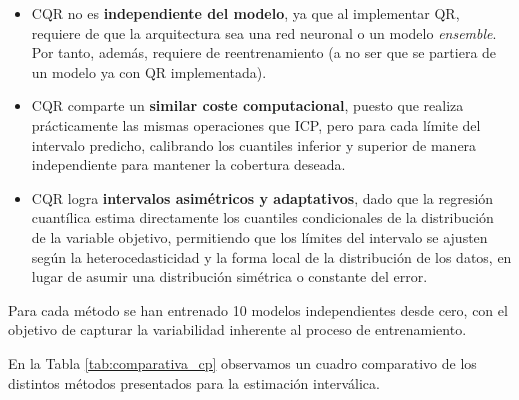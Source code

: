 \begin{itemize}
    \item \acrshort{CQR} no es \textbf{independiente del modelo}, ya que al implementar \acrshort{QR}, requiere de que la arquitectura sea una red neuronal o un modelo \textit{ensemble}. Por tanto, además, requiere de reentrenamiento (a no ser que se partiera de un modelo ya con \acrshort{QR} implementada).
    \item \acrshort{CQR} comparte un \textbf{similar coste computacional}, puesto que realiza prácticamente las mismas operaciones que \acrshort{ICP}, pero para cada límite del intervalo predicho, calibrando los cuantiles inferior y superior de manera independiente para mantener la cobertura deseada. 
    \item \acrshort{CQR} logra \textbf{intervalos asimétricos y adaptativos}, dado que la regresión cuantílica estima directamente los cuantiles condicionales de la distribución de la variable objetivo, permitiendo que los límites del intervalo se ajusten según la heterocedasticidad y la forma local de la distribución de los datos, en lugar de asumir una distribución simétrica o constante del error. 
\end{itemize}

Para cada método se han entrenado 10 modelos independientes desde cero, con el objetivo de capturar la variabilidad inherente al proceso de entrenamiento.

En la Tabla \ref{tab:comparativa_cp} observamos un cuadro comparativo de los distintos métodos presentados para la estimación interválica. 

